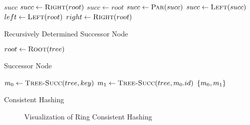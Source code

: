 \begin{algorithm}
    \begin{algorithmic}
                \State \Return $succ$
                \State $succ \gets \Call{Right}{root}$
                    \State $succ \gets root$
                        \State $succ \gets \Call{Par}{succ}$
                    \EndWhile
                \Else
                        \State $succ \gets \Call{Left}{succ}$
                    \EndWhile
                \EndIf
                \State $left \gets \Call{Left}{root}$
                \State \Return {}
            \Else
                \State $right \gets \Call{Right}{root}$
                \State \Return {}
            \EndIf
        \EndProcedure
    \end{algorithmic}
    \caption{Recursively Determined Successor Node}
    \label{alg:recur-succ}
\end{algorithm}
%
\begin{algorithm}
    \begin{algorithmic}
                \State \Return {}
            \Else
                \State $root \gets \Call{Root}{tree}$
                \State \Return {}
            \EndIf
        \EndProcedure
    \end{algorithmic}
    \caption{Successor Node}
    \label{alg:tree-succ}
\end{algorithm}
%
\begin{algorithm}
    \begin{algorithmic}
            \State $m_0 \gets \Call{Tree-Succ}{tree, key}$
            \State $m_1 \gets \Call{Tree-Succ}{tree, m_0.id}$
            \State \Return $\left\{m_0, m_1\right\}$
        \EndProcedure
    \end{algorithmic}
    \caption{Consistent Hashing}
    \label{alg:consistent-hashing}
\end{algorithm}
%
\begin{figure}
    \centering
    
    \caption{Visualization of Ring Consistent Hashing}
    \label{fig:ring-hash-process}
\end{figure}
%
